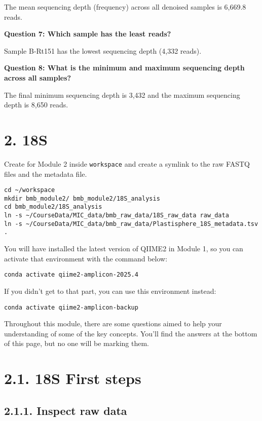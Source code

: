\documentclass[
]{book}
\begin{document}
The mean sequencing depth (frequency) across all denoised samples is 6,669.8 reads.

\textbf{Question 7: Which sample has the least reads?}

Sample B-Rt151 has the lowest sequencing depth (4,332 reads).

\textbf{Question 8: What is the minimum and maximum sequencing depth across all samples?}

The final minimum sequencing depth is 3,432 and the maximum sequencing depth is 8,650 reads.

\section{2. 18S}\label{s-1}

Create for Module 2 inside \texttt{workspace} and create a symlink to the raw FASTQ files and the metadata file.

\begin{verbatim}
cd ~/workspace
mkdir bmb_module2/ bmb_module2/18S_analysis
cd bmb_module2/18S_analysis
ln -s ~/CourseData/MIC_data/bmb_raw_data/18S_raw_data raw_data
ln -s ~/CourseData/MIC_data/bmb_raw_data/Plastisphere_18S_metadata.tsv .
\end{verbatim}

You will have installed the latest version of QIIME2 in Module 1, so you can activate that environment with the command below:

\begin{verbatim}
conda activate qiime2-amplicon-2025.4
\end{verbatim}

If you didn't get to that part, you can use this environment instead:

\begin{verbatim}
conda activate qiime2-amplicon-backup
\end{verbatim}

Throughout this module, there are some questions aimed to help your understanding of some of the key concepts. You'll find the answers at the bottom of this page, but no one will be marking them.

\section{2.1. 18S First steps}\label{s-first-steps-1}

\subsection{2.1.1. Inspect raw data}\label{inspect-raw-data-1}
\end{document}
